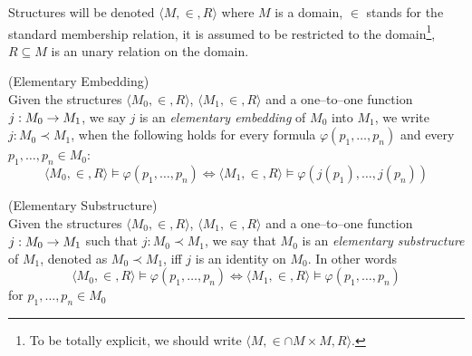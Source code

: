 Structures will be denoted $\langle M, \in, R \rangle$ where $M$ is a domain, $\in$ stands for the standard membership relation, it is assumed to be restricted to the domain\footnote{To be totally explicit, we should write $\langle M, \in \cap M \times M, R \rangle$.}, $R \subseteq M$ is an unary relation on the domain. %

\begin{definition}{(Elementary Embedding)}\label{def:elementary_embedding}\\
Given the structures $\langle M_0, \in, R \rangle$, $\langle M_1, \in, R \rangle$ and a one–to–one function $j: M_0 \rightarrow M_1$, we say $j$ is an \emph{elementary embedding} of $M_0$ into $M_1$, we write $j: M_0 \prec M_1$, when the following holds for every formula $\varphi(p_1, \ldots, p_n)$ and every $p_1, \ldots, p_n \in M_0$:
\begin{equation}
\langle M_0, \in, R \rangle \models \varphi(p_1, \ldots, p_n) \iff \langle M_1, \in, R \rangle  \models \varphi(j(p_1), \ldots, j(p_n))
\end{equation}
\end{definition}


\begin{definition}{(Elementary Substructure)}\label{def:elementary_substructure}\\
Given the structures $\langle M_0, \in, R \rangle$, $\langle M_1, \in, R \rangle$ and a one–to–one function $j: M_0 \rightarrow M_1$ such that $j: M_0 \prec M_1$, we say that $M_0$ is an \emph{elementary substructure} of $M_1$, denoted as $M_0 \prec M_1$, iff $j$ is an identity on $M_0$. In other words
\begin{equation}
\langle M_0, \in, R \rangle \models \varphi(p_1, \ldots, p_n) \iff \langle M_1, \in, R \rangle  \models \varphi(p_1, \ldots, p_n)
\end{equation}
for $p_1, \ldots, p_n \in M_0$
\end{definition}
